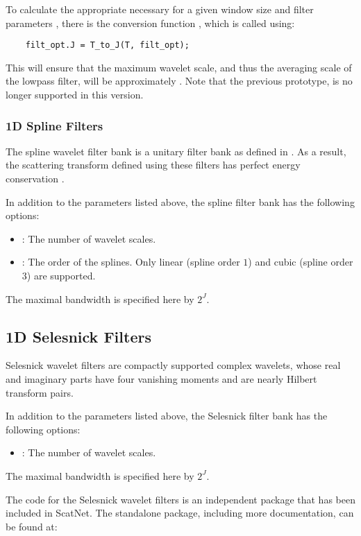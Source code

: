 \documentclass{article}
\begin{document}
To calculate the appropriate  necessary for a given window size  and filter parameters , there is the conversion function , which is called using:
\begin{lstlisting}
	filt_opt.J = T_to_J(T, filt_opt);
\end{lstlisting}
This will ensure that the maximum wavelet scale, and thus the averaging scale of the lowpass filter, will be approximately . Note that the previous prototype,  is no longer supported in this version.

\subsubsection{1D Spline Filters}
The spline wavelet filter bank is a unitary filter bank as defined in \cite{mallatbook}. As a result, the scattering transform defined using these filters has perfect energy conservation \cite{stephane}.

In addition to the parameters listed above, the spline filter bank has the following options:
\begin{itemize}
	\item {}: The number of wavelet scales.
	\item {}: The order of the splines. Only linear (spline order $1$) and cubic (spline order $3$) are supported.
\end{itemize}
The maximal bandwidth is specified here by $2^J$.

\subsection{1D Selesnick Filters}
Selesnick wavelet filters are compactly supported complex wavelets, whose real and imaginary parts have four vanishing moments and are nearly Hilbert transform pairs.

In addition to the parameters listed above, the Selesnick filter bank has the following options:
\begin{itemize}
  \item {}: The number of wavelet scales.
\end{itemize}
The maximal bandwidth is specified here by $2^J$.

The code for the Selesnick wavelet filters is an independent package that has been included in ScatNet. The standalone package, including more documentation, can be found at:
\end{document}
